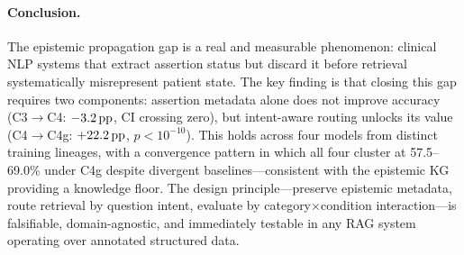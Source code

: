 \begin{sloppypar}
\paragraph{Conclusion.}
The epistemic propagation gap is a real and measurable phenomenon: clinical NLP systems that extract assertion status but discard it before retrieval systematically misrepresent patient state.
The key finding is that closing this gap requires two components: assertion metadata alone does not improve accuracy (C3$\to$C4: $-3.2\,\text{pp}$, CI crossing zero), but intent-aware routing unlocks its value (C4$\to$C4g: $+22.2\,\text{pp}$, $p < 10^{-10}$).
This holds across four models from distinct training lineages, with a convergence pattern in which all four cluster at 57.5--69.0\% under C4g despite divergent baselines---consistent with the epistemic KG providing a knowledge floor.
The design principle---preserve epistemic metadata, route retrieval by question intent, evaluate by category$\times$condition interaction---is falsifiable, domain-agnostic, and immediately testable in any RAG system operating over annotated structured data.
\end{sloppypar}

